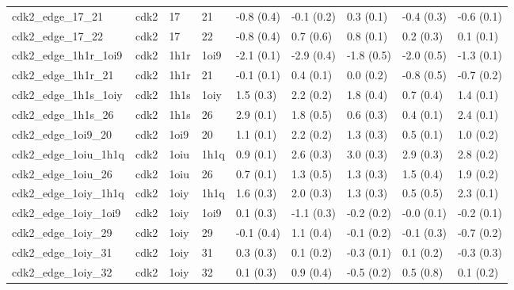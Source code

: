 \begin{tabular}{lllllllll}
cdk2\_edge\_17\_21                  &      cdk2 &          17 &          21 &  -0.8 (0.4) &        -0.1 (0.2) &   0.3 (0.1) &  -0.4 (0.3) &  -0.6 (0.1) \\
cdk2\_edge\_17\_22                  &      cdk2 &          17 &          22 &  -0.8 (0.4) &         0.7 (0.6) &   0.8 (0.1) &   0.2 (0.3) &   0.1 (0.1) \\
cdk2\_edge\_1h1r\_1oi9              &      cdk2 &        1h1r &        1oi9 &  -2.1 (0.1) &        -2.9 (0.4) &  -1.8 (0.5) &  -2.0 (0.5) &  -1.3 (0.1) \\
cdk2\_edge\_1h1r\_21                &      cdk2 &        1h1r &          21 &  -0.1 (0.1) &         0.4 (0.1) &   0.0 (0.2) &  -0.8 (0.5) &  -0.7 (0.2) \\
cdk2\_edge\_1h1s\_1oiy              &      cdk2 &        1h1s &        1oiy &   1.5 (0.3) &         2.2 (0.2) &   1.8 (0.4) &   0.7 (0.4) &   1.4 (0.1) \\
cdk2\_edge\_1h1s\_26                &      cdk2 &        1h1s &          26 &   2.9 (0.1) &         1.8 (0.5) &   0.6 (0.3) &   0.4 (0.1) &   2.4 (0.1) \\
cdk2\_edge\_1oi9\_20                &      cdk2 &        1oi9 &          20 &   1.1 (0.1) &         2.2 (0.2) &   1.3 (0.3) &   0.5 (0.1) &   1.0 (0.2) \\
cdk2\_edge\_1oiu\_1h1q              &      cdk2 &        1oiu &        1h1q &   0.9 (0.1) &         2.6 (0.3) &   3.0 (0.3) &   2.9 (0.3) &   2.8 (0.2) \\
cdk2\_edge\_1oiu\_26                &      cdk2 &        1oiu &          26 &   0.7 (0.1) &         1.3 (0.5) &   1.3 (0.3) &   1.5 (0.4) &   1.9 (0.2) \\
cdk2\_edge\_1oiy\_1h1q              &      cdk2 &        1oiy &        1h1q &   1.6 (0.3) &         2.0 (0.3) &   1.3 (0.3) &   0.5 (0.5) &   2.3 (0.1) \\
cdk2\_edge\_1oiy\_1oi9              &      cdk2 &        1oiy &        1oi9 &   0.1 (0.3) &        -1.1 (0.3) &  -0.2 (0.2) &  -0.0 (0.1) &  -0.2 (0.1) \\
cdk2\_edge\_1oiy\_29                &      cdk2 &        1oiy &          29 &  -0.1 (0.4) &         1.1 (0.4) &  -0.1 (0.2) &  -0.1 (0.3) &  -0.7 (0.2) \\
cdk2\_edge\_1oiy\_31                &      cdk2 &        1oiy &          31 &   0.3 (0.3) &         0.1 (0.2) &  -0.3 (0.1) &   0.1 (0.2) &  -0.3 (0.3) \\
cdk2\_edge\_1oiy\_32                &      cdk2 &        1oiy &          32 &   0.1 (0.3) &         0.9 (0.4) &  -0.5 (0.2) &   0.5 (0.8) &   0.1 (0.2) \\

\end{tabular}
